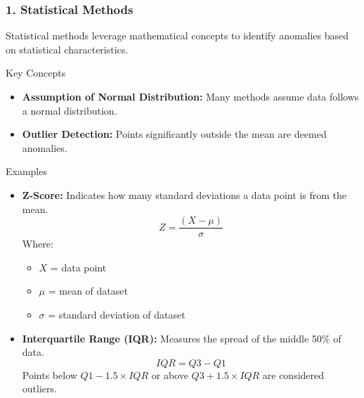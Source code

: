 \documentclass{beamer}
\begin{document}
\begin{frame}[fragile]
    \frametitle{1. Statistical Methods}
    Statistical methods leverage mathematical concepts to identify anomalies based on statistical characteristics.

    \begin{block}{Key Concepts}
        \begin{itemize}
            \item \textbf{Assumption of Normal Distribution:} Many methods assume data follows a normal distribution.
            \item \textbf{Outlier Detection:} Points significantly outside the mean are deemed anomalies.
        \end{itemize}
    \end{block}

    \begin{block}{Examples}
        \begin{itemize}
            \item \textbf{Z-Score:} Indicates how many standard deviations a data point is from the mean.
            \begin{equation}
                Z = \frac{(X - \mu)}{\sigma}
            \end{equation}
            Where:
            \begin{itemize}
                \item \(X\) = data point
                \item \(\mu\) = mean of dataset
                \item \(\sigma\) = standard deviation of dataset
            \end{itemize}
            
            \item \textbf{Interquartile Range (IQR):} Measures the spread of the middle 50\% of data.
            \begin{equation}
                IQR = Q3 - Q1 
            \end{equation}
            Points below \(Q1 - 1.5 \times IQR\) or above \(Q3 + 1.5 \times IQR\) are considered outliers.
        \end{itemize}
    \end{block}
\end{frame}
\end{document}
